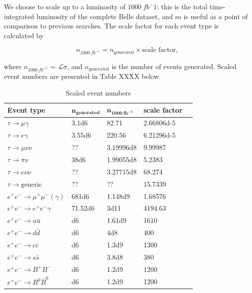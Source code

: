 \documentclass[12pt]{thesis}  %
\begin{document}
We choose to scale up to a luminosity of $\SI{1000}{fb^-1}$; this is the total time-integrated luminosity of the complete Belle dataset, and so is useful as a point of comparison to previous searches. The scale factor for each event type is calculated by

\begin{equation}
n_{\SI{1000}{fb^{-1}}} = n_{\text{generated}} \times \text{scale factor},
\end{equation}

where $n_{\SI{1000}{fb^{-1}}}$ = $\mathcal{L} \sigma$, and $n_{\text{generated}}$ is the number of events generated. Scaled event numbers are presented in Table XXXX below.

\begin{table}[h]
\centering
\begin{tabular}{lllll}
\textbf{Event type} & $\mathbf{n_{\text{generated}}}$ & $\mathbf{n_{\SI{1000}{fb^{-1}}}}$ & 
\textbf{scale factor}\\\hline
\rowcolor[HTML]{EFEFEF} 
$\tau \to \mu\gamma$ & \num{3.1d6} & 82.71 & \num{2.66806d-5}\\
\rowcolor[HTML]{EFEFEF} 
$\tau \to e\gamma$ & \num{3.55d6} & 220.56 & \num{6.21296d-5} \\       
$\tau \to \mu\nu\nu$ & ?? & \num{3.19996d8} & 9.99987\\
$\tau \to \pi\nu$ & \num{38d6} & \num{1.99055d8} & 5.2383 \\
$\tau \to e\nu\nu$ & ?? & \num{3.27715d8} & 68.274 \\
$\tau \to \text{generic}$ & ?? & ?? & 15.7339  \\
$e^+e^- \to \mu^+\mu^-(\gamma)$ & \num{681d6} & \num{1.148d9} & 1.68576 \\
$e^+e^- \to e^+e^-\gamma$ & \num{71.52d6} & \num{3d11} & 4194.63 \\
$e^+e^- \to u\bar{u}$ & \num{d6} & \num{1.61d9} & 1610 \\
$e^+e^- \to d\bar{d}$ & \num{d6} & \num{4d8} & 400 \\
$e^+e^- \to c\bar{c}$ & \num{d6} & \num{1.3d9} & 1300 \\
$e^+e^- \to s\bar{s}$ & \num{d6} & \num{3.8d8} & 380 \\
$e^+e^- \to B^+B^-$ & \num{d6} & \num{1.2d9} & 1200 \\
$e^+e^- \to B^0\bar{B}^0$ & \num{d6} & \num{1.2d9} & 1200
\end{tabular}
\caption{Scaled event numbers}
\label{my-label}
\end{table}
\end{document}
